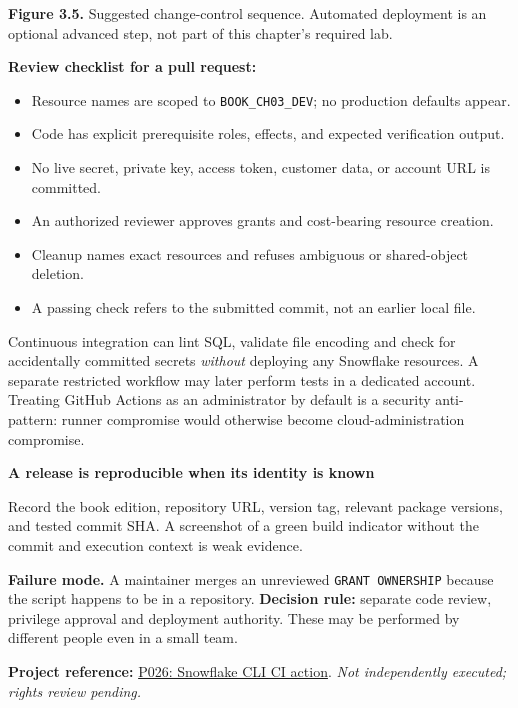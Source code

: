 \documentclass[11pt,twoside]{article}
\newcommand{\repo}[2]{\par\begingroup\fontsize{8.0}{9.6}\selectfont\sffamily\color{inkgray}\textbf{Project reference:} \href{#2}{#1}. \textit{Not independently executed; rights review pending.}\par\endgroup}
\begin{document}
\begin{center}
\end{center}
{\small\color{inkgray}\textbf{Figure 3.5.} Suggested change-control sequence. Automated deployment is an optional advanced step, not part of this chapter's required lab.}\par
\textbf{Review checklist for a pull request:}
\begin{itemize}
\item Resource names are scoped to \texttt{BOOK\_CH03\_DEV}; no production defaults appear.
\item Code has explicit prerequisite roles, effects, and expected verification output.
\item No live secret, private key, access token, customer data, or account URL is committed.
\item An authorized reviewer approves grants and cost-bearing resource creation.
\item Cleanup names exact resources and refuses ambiguous or shared-object deletion.
\item A passing check refers to the submitted commit, not an earlier local file.
\end{itemize}
Continuous integration can lint SQL, validate file encoding and check for accidentally committed secrets \emph{without} deploying any Snowflake resources. A separate restricted workflow may later perform tests in a dedicated account. Treating GitHub Actions as an administrator by default is a security anti-pattern: runner compromise would otherwise become cloud-administration compromise.

\begin{insight}
\textbf{A release is reproducible when its identity is known}\par
Record the book edition, repository URL, version tag, relevant package versions, and tested commit SHA. A screenshot of a green build indicator without the commit and execution context is weak evidence.
\end{insight}
\textbf{Failure mode.} A maintainer merges an unreviewed \texttt{GRANT OWNERSHIP} because the script happens to be in a repository. \textbf{Decision rule:} separate code review, privilege approval and deployment authority. These may be performed by different people even in a small team.
\repo{P026: Snowflake CLI CI action}{https://github.com/snowflakedb/snowflake-cli-action}
\end{document}
